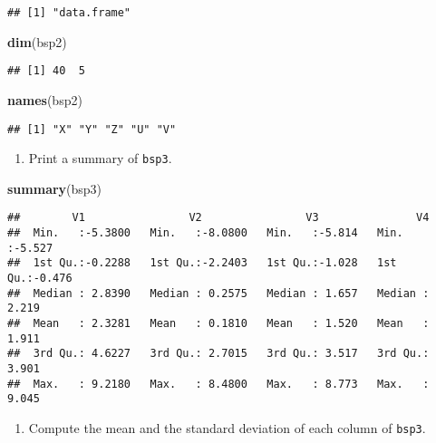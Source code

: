 \documentclass[]{article}
\newenvironment{Shaded}{\begin{snugshade}}{\end{snugshade}}
\newcommand{\KeywordTok}[1]{\textcolor[rgb]{0.13,0.29,0.53}{\textbf{#1}}}
\newcommand{\NormalTok}[1]{#1}
\providecommand{\tightlist}{%
  \setlength{\itemsep}{0pt}\setlength{\parskip}{0pt}}
\begin{document}
\begin{verbatim}
## [1] "data.frame"
\end{verbatim}

\begin{Shaded}
\begin{Highlighting}[]
\KeywordTok{dim}\NormalTok{(bsp2)}
\end{Highlighting}
\end{Shaded}

\begin{verbatim}
## [1] 40  5
\end{verbatim}

\begin{Shaded}
\begin{Highlighting}[]
\KeywordTok{names}\NormalTok{(bsp2)}
\end{Highlighting}
\end{Shaded}

\begin{verbatim}
## [1] "X" "Y" "Z" "U" "V"
\end{verbatim}

\begin{enumerate}
\def\labelenumi{\arabic{enumi}.}
\setcounter{enumi}{3}
\tightlist
\item
  Print a summary of \texttt{bsp3}.
\end{enumerate}

\begin{Shaded}
\begin{Highlighting}[]
\KeywordTok{summary}\NormalTok{(bsp3)}
\end{Highlighting}
\end{Shaded}

\begin{verbatim}
##        V1                V2                V3               V4        
##  Min.   :-5.3800   Min.   :-8.0800   Min.   :-5.814   Min.   :-5.527  
##  1st Qu.:-0.2288   1st Qu.:-2.2403   1st Qu.:-1.028   1st Qu.:-0.476  
##  Median : 2.8390   Median : 0.2575   Median : 1.657   Median : 2.219  
##  Mean   : 2.3281   Mean   : 0.1810   Mean   : 1.520   Mean   : 1.911  
##  3rd Qu.: 4.6227   3rd Qu.: 2.7015   3rd Qu.: 3.517   3rd Qu.: 3.901  
##  Max.   : 9.2180   Max.   : 8.4800   Max.   : 8.773   Max.   : 9.045
\end{verbatim}

\begin{enumerate}
\def\labelenumi{\arabic{enumi}.}
\setcounter{enumi}{4}
\tightlist
\item
  Compute the mean and the standard deviation of each column of
  \texttt{bsp3}.
\end{enumerate}
\end{document}

